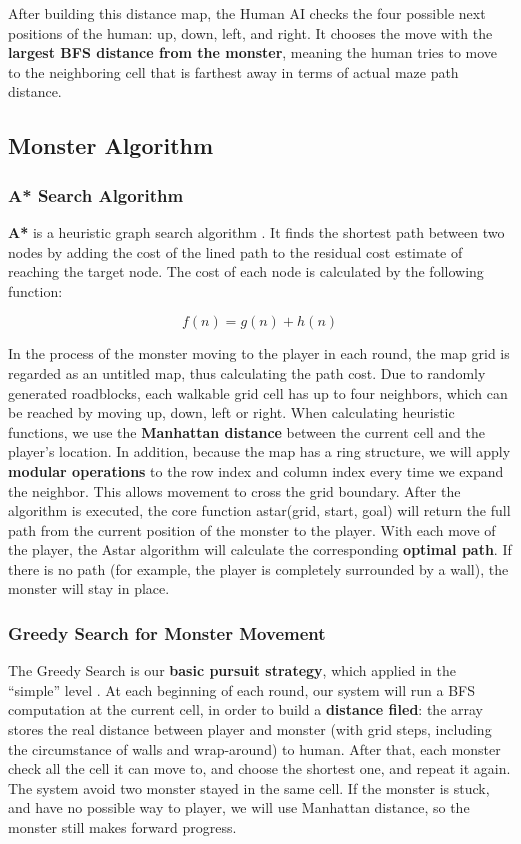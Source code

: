 \documentclass[12pt,a4paper]{article}
\begin{document}
After building this distance map, 
the Human AI checks the four possible next positions of the human: 
up, down, left, and right. 
It chooses the move with the \textbf{largest BFS distance from the monster}, 
meaning the human tries to move to the neighboring cell 
that is farthest away in terms of actual maze path distance.

\subsection{Monster Algorithm}

\subsubsection{A* Search Algorithm}

\textbf{A*} is a heuristic graph search algorithm \cite{hart1968astar}. It finds the shortest path between two nodes by adding the cost of the lined path to the residual cost estimate of reaching the target node. The cost of each node is calculated by the following function:

\[
f(n) = g(n) + h(n)
\]

In the process of the monster moving to the player in each round, the map grid is regarded as an untitled map, thus calculating the path cost. Due to randomly generated roadblocks, each walkable grid cell has up to four neighbors, which can be reached by moving up, down, left or right. When calculating heuristic functions, we use the \textbf{Manhattan distance} between the current cell and the player's location. In addition, because the map has a ring structure, we will apply \textbf{modular operations} to the row index and column index every time we expand the neighbor. This allows movement to cross the grid boundary. After the algorithm is executed, the core function astar(grid, start, goal) will return the full path from the current position of the monster to the player. With each move of the player, the Astar algorithm will calculate the corresponding \textbf{optimal path}. If there is no path (for example, the player is completely surrounded by a wall), the monster will stay in place.


\subsubsection{Greedy Search for Monster Movement}

The Greedy Search is our \textbf{basic pursuit strategy}, which applied in the ``simple'' level \cite{russell2020aima}. At each beginning of each round, our system will run a BFS computation at the current cell, in order to build a \textbf{distance filed}: the array stores the real distance between player and monster (with grid steps, including the circumstance of walls and wrap-around) to human. After that, each monster check all the cell it can move to, and choose the shortest one, and repeat it again. The system avoid two monster stayed in the same cell. If the monster is stuck, and have no possible way to player, we will use Manhattan distance, so the monster still makes forward progress.
\end{document}
